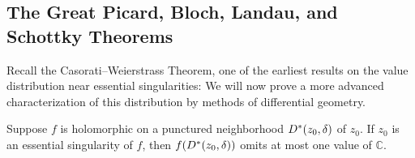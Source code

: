 \subsection{The Great Picard, Bloch, Landau, and Schottky Theorems}
Recall the Casorati--Weierstrass Theorem, one of the earliest results on the value distribution near essential singularities:  We will now prove a more advanced characterization of this distribution by methods of differential geometry.
\begin{theorem}[name=\textsc{Picard's Great Theorem},store=thm:greatpicard]\label{thm:greatpicard}
    Suppose \(f\) is holomorphic on a punctured neighborhood \(D^*\qty(z_0,\delta)\) of \(z_0\). If \(z_0\) is an essential singularity of \(f\), then \(f\qty(D^*\qty(z_0,\delta))\) omits at most one value of \(\mathbb{C}\).
\end{theorem}

